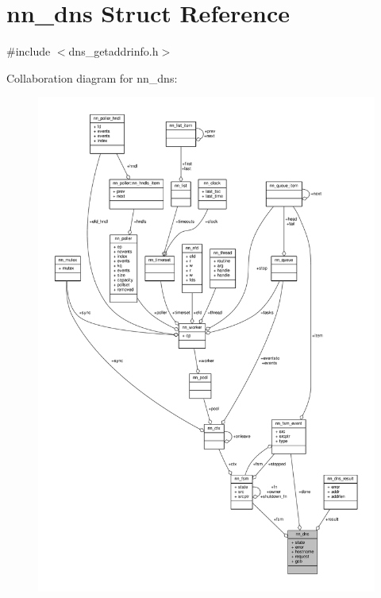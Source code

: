 \hypertarget{structnn__dns}{}\section{nn\+\_\+dns Struct Reference}
\label{structnn__dns}


{\ttfamily \#include $<$dns\+\_\+getaddrinfo.\+h$>$}



Collaboration diagram for nn\+\_\+dns\+:\nopagebreak
\begin{figure}[H]
\begin{center}
\leavevmode
\includegraphics[width=350pt]{structnn__dns__coll__graph}
\end{center}
\end{figure}
